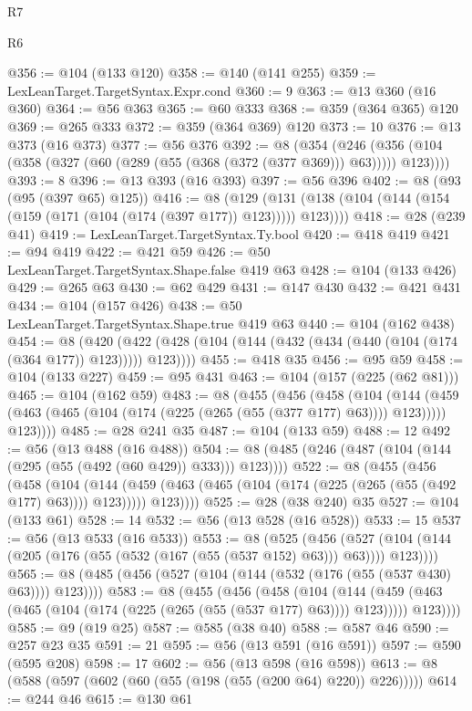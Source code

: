 \begin{lexlean}{R7}
\begin{lexlean}{R6}
\begin{coremodule}
{{{{{{{{{{{{{{{{{{{{@356 := @104 (@133 @120)
@358 := @140 (@141 @255)
@359 := LexLeanTarget.TargetSyntax.Expr.cond
@360 := 9
@363 := @13 @360 (@16 @360)
@364 := @56 @363
@365 := @60 @333
@368 := @359 (@364 @365) @120
@369 := @265 @333
@372 := @359 (@364 @369) @120
@373 := 10
@376 := @13 @373 (@16 @373)
@377 := @56 @376
@392 := @8
    (@354 (@246 (@356 (@104 (@358 (@327 (@60 (@289 (@55 (@368 (@372 (@377 @369))) @63))))) @123))))
@393 := 8
@396 := @13 @393 (@16 @393)
@397 := @56 @396
@402 := @8 (@93 (@95 (@397 @65) @125))
@416 := @8
    (@129 (@131 (@138 (@104 (@144 (@154 (@159 (@171 (@104 (@174 (@397 @177)) @123))))) @123))))
@418 := @28 (@239 @41)
@419 := LexLeanTarget.TargetSyntax.Ty.bool
@420 := @418 @419
@421 := @94 @419
@422 := @421 @59
@426 := @50 LexLeanTarget.TargetSyntax.Shape.false @419 @63
@428 := @104 (@133 @426)
@429 := @265 @63
@430 := @62 @429
@431 := @147 @430
@432 := @421 @431
@434 := @104 (@157 @426)
@438 := @50 LexLeanTarget.TargetSyntax.Shape.true @419 @63
@440 := @104 (@162 @438)
@454 := @8
    (@420 (@422 (@428 (@104 (@144 (@432 (@434 (@440 (@104 (@174 (@364 @177)) @123))))) @123))))
@455 := @418 @35
@456 := @95 @59
@458 := @104 (@133 @227)
@459 := @95 @431
@463 := @104 (@157 (@225 (@62 @81)))
@465 := @104 (@162 @59)
@483 := @8
    (@455
      (@456
        (@458
          (@104
            (@144 (@459 (@463 (@465 (@104 (@174 (@225 (@265 (@55 (@377 @177) @63)))) @123)))))
            @123))))
@485 := @28 @241 @35
@487 := @104 (@133 @59)
@488 := 12
@492 := @56 (@13 @488 (@16 @488))
@504 := @8 (@485 (@246 (@487 (@104 (@144 (@295 (@55 (@492 (@60 @429)) @333))) @123))))
@522 := @8
    (@455
      (@456
        (@458
          (@104
            (@144 (@459 (@463 (@465 (@104 (@174 (@225 (@265 (@55 (@492 @177) @63)))) @123)))))
            @123))))
@525 := @28 (@38 @240) @35
@527 := @104 (@133 @61)
@528 := 14
@532 := @56 (@13 @528 (@16 @528))
@533 := 15
@537 := @56 (@13 @533 (@16 @533))
@553 := @8
    (@525
      (@456 (@527 (@104 (@144 (@205 (@176 (@55 (@532 (@167 (@55 (@537 @152) @63))) @63)))) @123))))
@565 := @8 (@485 (@456 (@527 (@104 (@144 (@532 (@176 (@55 (@537 @430) @63)))) @123))))
@583 := @8
    (@455
      (@456
        (@458
          (@104
            (@144 (@459 (@463 (@465 (@104 (@174 (@225 (@265 (@55 (@537 @177) @63)))) @123)))))
            @123))))
@585 := @9 (@19 @25)
@587 := @585 (@38 @40)
@588 := @587 @46
@590 := @257 @23 @35
@591 := 21
@595 := @56 (@13 @591 (@16 @591))
@597 := @590 (@595 @208)
@598 := 17
@602 := @56 (@13 @598 (@16 @598))
@613 := @8 (@588 (@597 (@602 (@60 (@55 (@198 (@55 (@200 @64) @220)) @226)))))
@614 := @244 @46
@615 := @130 @61
}}}}}}}}}}}}}}}}}}}}
\end{coremodule}
\end{lexlean}
\end{lexlean}
